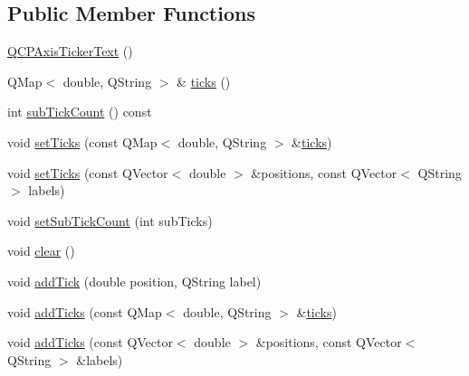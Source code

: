 \subsection*{Public Member Functions}
\begin{DoxyCompactItemize}
\item 
\mbox{\hyperlink{class_q_c_p_axis_ticker_text_a1d7243b1256c1aa9d1d5b99b2e84e648}{Q\+C\+P\+Axis\+Ticker\+Text}} ()
\item 
Q\+Map$<$ double, Q\+String $>$ \& \mbox{\hyperlink{class_q_c_p_axis_ticker_text_ac84622a6bb4f2a98474e185ecaf3189a}{ticks}} ()
\item 
int \mbox{\hyperlink{class_q_c_p_axis_ticker_text_a5c3c59e8fdf4c96568dd50d4a653e791}{sub\+Tick\+Count}} () const
\item 
void \mbox{\hyperlink{class_q_c_p_axis_ticker_text_a8cdf1f21940f1f53f5e3d30b2c74f5cf}{set\+Ticks}} (const Q\+Map$<$ double, Q\+String $>$ \&\mbox{\hyperlink{class_q_c_p_axis_ticker_text_ac84622a6bb4f2a98474e185ecaf3189a}{ticks}})
\item 
void \mbox{\hyperlink{class_q_c_p_axis_ticker_text_a69f3898cc1cf11d2437851f959faa1e8}{set\+Ticks}} (const Q\+Vector$<$ double $>$ \&positions, const Q\+Vector$<$ Q\+String $>$ labels)
\item 
void \mbox{\hyperlink{class_q_c_p_axis_ticker_text_a8cfa50c51183c90186892eeef978d571}{set\+Sub\+Tick\+Count}} (int sub\+Ticks)
\item 
void \mbox{\hyperlink{class_q_c_p_axis_ticker_text_a21826d2fcd9a25c194d34d4f67aa1460}{clear}} ()
\item 
void \mbox{\hyperlink{class_q_c_p_axis_ticker_text_aada3db69e5fc6585aaa4ea5d89552eb0}{add\+Tick}} (double position, Q\+String label)
\item 
void \mbox{\hyperlink{class_q_c_p_axis_ticker_text_aba34051300eecaefbedb2df8feff2d45}{add\+Ticks}} (const Q\+Map$<$ double, Q\+String $>$ \&\mbox{\hyperlink{class_q_c_p_axis_ticker_text_ac84622a6bb4f2a98474e185ecaf3189a}{ticks}})
\item 
void \mbox{\hyperlink{class_q_c_p_axis_ticker_text_a8140c730e20b0050e1b702af3db00b2e}{add\+Ticks}} (const Q\+Vector$<$ double $>$ \&positions, const Q\+Vector$<$ Q\+String $>$ \&labels)
\end{DoxyCompactItemize}

